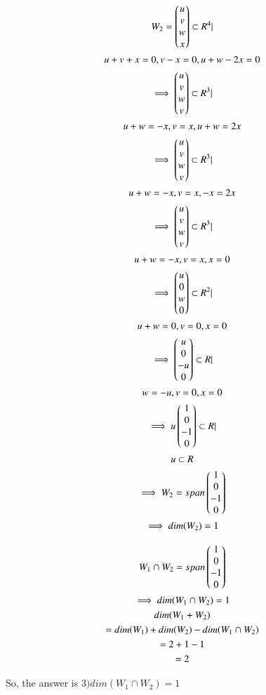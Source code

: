 \begin{enumerate}
\begin{multline}
    W_{2}=\begin{pmatrix}u\\v\\w\\x\end{pmatrix}\subset R^{4} | \\ u+v+x=0,v-x=0,u+w-2x=0
\\
    \implies \begin{pmatrix}u\\v\\w\\v\end{pmatrix}\subset R^{3} | \\ u+w=-x,v=x,u+w=2x
\\
    \implies \begin{pmatrix}u\\v\\w\\v\end{pmatrix}\subset R^{3} | \\ u+w=-x,v=x,-x=2x
\\
    \implies \begin{pmatrix}u\\v\\w\\v\end{pmatrix}\subset R^{3} | \\ u+w=-x,v=x,x=0
\\
   \implies \begin{pmatrix}u\\0\\w\\0\end{pmatrix}\subset R^{2} | \\ u+w=0,v=0,x=0
\\
   \implies \begin{pmatrix}u\\0\\-u\\0\end{pmatrix}\subset R | \\ w=-u,v=0,x=0
\\
    \implies u\begin{pmatrix}1\\0\\-1\\0\end{pmatrix}\subset R | \\ u \subset R
\\
    \implies W_{2}= span\begin{pmatrix}1\\0\\-1\\0\end{pmatrix}
\\
    \implies dim(W_{2})=1
\end{multline}



\begin{multline}
    W_{1} \cap W_{2} = span\begin{pmatrix}1\\0\\-1\\0\end{pmatrix}
\\
    \implies dim(W_{1} \cap W_{2})=1
\\
    dim(W_{1}+W_{2}) \\ =dim(W_{1})+dim(W_{2})-dim(W_{1} \cap W_{2})
\\
    =2+1-1
\\
    =2
\end{multline}

So, the answer is $3) dim(W_{1}\cap W_{2})=1$
\end{enumerate}




